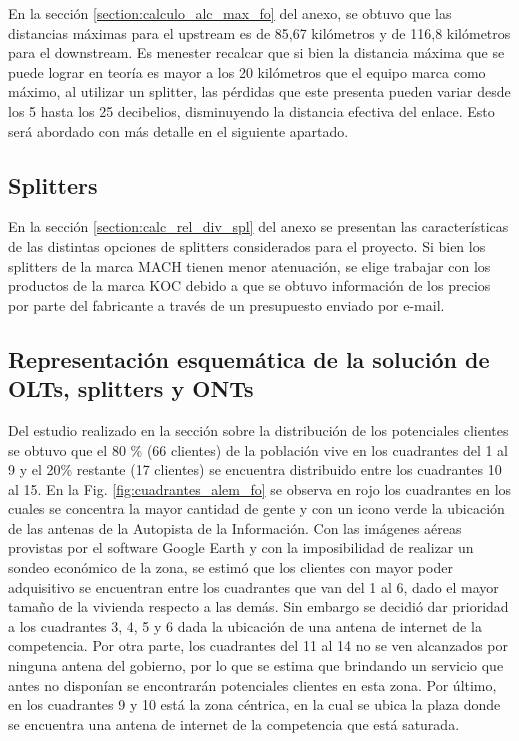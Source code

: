 \documentclass[11pt,a4paper]{article}
\begin{document}
En la sección \ref{section:calculo_alc_max_fo} del anexo, se obtuvo que las distancias máximas para el upstream es de 85,67 kilómetros y de 116,8 kilómetros para el downstream.
Es menester recalcar que si bien la distancia máxima que se puede lograr en teoría es mayor a los 20 kilómetros que el equipo marca como máximo, al utilizar un splitter, las pérdidas que este presenta pueden variar desde los 5 hasta los 25 decibelios, disminuyendo la distancia efectiva del enlace. 
Esto será abordado con más detalle en el siguiente apartado.
  
\subsection{Splitters}
  
En la sección \ref{section:calc_rel_div_spl} del anexo se presentan las características de las distintas opciones de splitters considerados para el proyecto.    
Si bien los splitters de la marca MACH tienen menor atenuación, se elige trabajar con los productos de la marca KOC debido a que se obtuvo información de los precios por parte del fabricante a través de un presupuesto enviado por e-mail. 

\subsection{Representación esquemática de la solución de OLTs, splitters y ONTs}
    
Del estudio realizado en la sección  sobre la distribución de los potenciales clientes se obtuvo que el 80 \% (66 clientes) de la población vive en los cuadrantes del 1 al 9 y el 20\% restante (17 clientes) se encuentra distribuido entre los cuadrantes 10 al 15.
En la Fig. \ref{fig:cuadrantes_alem_fo} se observa en rojo los cuadrantes en los cuales se concentra la mayor cantidad de gente y con un icono verde la ubicación de las antenas de la Autopista de la Información. 
Con las imágenes aéreas provistas por el software Google Earth y con la imposibilidad de realizar un sondeo económico de la zona, se estimó que los clientes con mayor poder adquisitivo se encuentran entre los cuadrantes que van del 1 al 6, dado el mayor tamaño de la vivienda respecto a las demás. 
Sin embargo se decidió dar prioridad a los cuadrantes 3, 4, 5 y 6 dada la ubicación de una antena de internet de la competencia. 
Por otra parte, los cuadrantes del 11 al 14 no se ven alcanzados por ninguna antena del gobierno, por lo que se estima que brindando un servicio que antes no disponían se encontrarán potenciales clientes en esta zona. 
Por último, en los cuadrantes 9 y 10 está la zona céntrica, en la cual se ubica la plaza donde se encuentra una antena de internet de la competencia que está saturada. 
\end{document}
